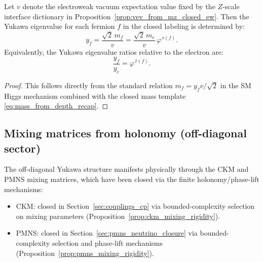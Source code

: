 \begin{proposition}\label{prop:yukawa_eigenvalue_closure}
\InterfaceTag Let $v$ denote the electroweak vacuum expectation value fixed by the $Z$-scale interface dictionary in Proposition~\ref{prop:vev_from_mz_closed_ew}.
Then the Yukawa eigenvalue for each fermion $f$ in the closed labeling is determined by:
\begin{equation}\label{eq:yukawa_from_depth}
y_f = \frac{\sqrt{2}\,m_f}{v} = \frac{\sqrt{2}\,m_e}{v}\,\varphi^{\,\widehat r(f)}.
\end{equation}
Equivalently, the Yukawa eigenvalue ratios relative to the electron are:
\begin{equation}\label{eq:yukawa_ratio_phi}
\frac{y_f}{y_e} = \varphi^{\,\widehat r(f)}.
\end{equation}
\end{proposition}
\begin{proof}
This follows directly from the standard relation $m_f = y_f v/\sqrt{2}$ in the SM Higgs mechanism \cite{PeskinSchroeder1995,PDGRPP2024} combined with the closed mass template \eqref{eq:mass_from_depth_recap}.
\end{proof}

\subsection{Mixing matrices from holonomy (off-diagonal sector)}
\label{subsec:mixing_from_holonomy}

The off-diagonal Yukawa structure manifests physically through the CKM and PMNS mixing matrices, which have been closed via the finite holonomy/phase-lift mechanisms:
\begin{itemize}
\item CKM: closed in Section~\ref{sec:couplings_cp} via bounded-complexity selection on mixing parameters (Proposition~\ref{prop:ckm_mixing_rigidity}).
\item PMNS: closed in Section~\ref{sec:pmns_neutrino_closure} via bounded-complexity selection and phase-lift mechanisms (Proposition~\ref{prop:pmns_mixing_rigidity}).
\end{itemize}


